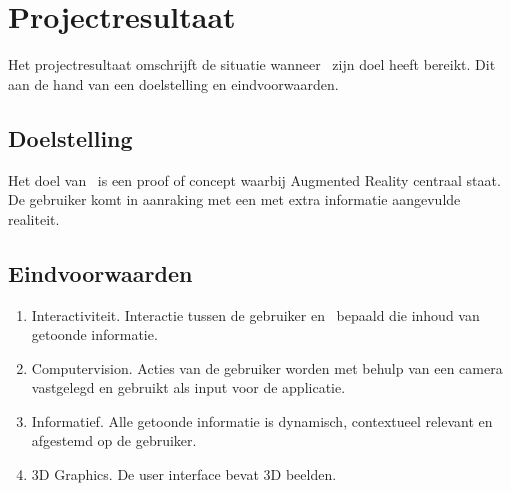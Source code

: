 \chapter{Projectresultaat} \label{cha:projectresultaat}
Het projectresultaat omschrijft de situatie wanneer \projectname\ zijn doel heeft bereikt. Dit aan de hand van een doelstelling en eindvoorwaarden.
\section{Doelstelling} \label{sec:doelstelling}
Het doel van \projectname\ is een proof of concept waarbij Augmented Reality centraal staat. De gebruiker komt in aanraking met een met extra informatie aangevulde realiteit.
\section{Eindvoorwaarden} \label{sec:eindvoorwaarden}
\begin{enumerate}
  \item Interactiviteit. Interactie tussen de gebruiker en \projectname\ bepaald die inhoud van getoonde informatie.
  \item Computervision. Acties van de gebruiker worden met behulp van een camera vastgelegd en gebruikt als input voor de applicatie.
  \item Informatief. Alle getoonde informatie is dynamisch, contextueel relevant en afgestemd op de gebruiker.
  \item 3D Graphics. De user interface bevat 3D beelden. 
\end{enumerate}